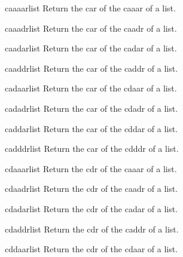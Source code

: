 \documentclass[10pt,english]{book}
\begin{document}
\begin{accessor}{caaaar}{list}
  Return the car of the caaar of a list.
\end{accessor}

\begin{accessor}{caaadr}{list}
  Return the car of the caadr of a list.
\end{accessor}

\begin{accessor}{caadar}{list}
  Return the car of the cadar of a list.
\end{accessor}

\begin{accessor}{caaddr}{list}
  Return the car of the caddr of a list.
\end{accessor}

\begin{accessor}{cadaar}{list}
  Return the car of the cdaar of a list.
\end{accessor}

\begin{accessor}{cadadr}{list}
  Return the car of the cdadr of a list.
\end{accessor}

\begin{accessor}{caddar}{list}
  Return the car of the cddar of a list.
\end{accessor}

\begin{accessor}{cadddr}{list}
  Return the car of the cdddr of a list.
\end{accessor}

\begin{accessor}{cdaaar}{list}
  Return the cdr of the caaar of a list.
\end{accessor}

\begin{accessor}{cdaadr}{list}
  Return the cdr of the caadr of a list.
\end{accessor}

\begin{accessor}{cdadar}{list}
  Return the cdr of the cadar of a list.
\end{accessor}

\begin{accessor}{cdaddr}{list}
  Return the cdr of the caddr of a list.
\end{accessor}

\begin{accessor}{cddaar}{list}
  Return the cdr of the cdaar of a list.
\end{accessor}
\end{document}
